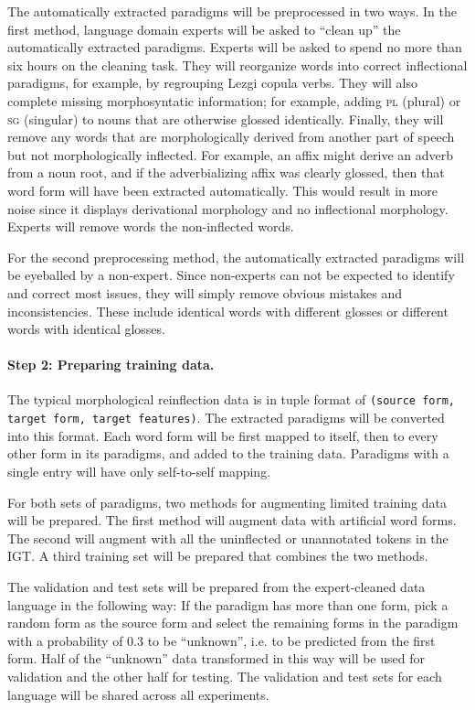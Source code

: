 The automatically extracted paradigms will be preprocessed in two ways. In the first method, language domain experts will be asked to ``clean up'' the automatically extracted paradigms. Experts will be asked to spend no more than six hours on the cleaning task. They will reorganize words into correct inflectional paradigms, for example, by regrouping Lezgi copula verbs. They will also complete missing morphosyntatic information; for example, adding \textsc{pl} (plural) or \textsc{sg} (singular) to nouns that are otherwise glossed identically. Finally, they will remove any words that are morphologically derived from another part of speech but not morphologically inflected. For example, an affix might derive an adverb from a noun root, and if the adverbializing affix was clearly glossed, then that word form will have been extracted automatically. This would result in more noise since it displays derivational morphology and no inflectional morphology. Experts will remove words the non-inflected words.

For the second preprocessing method, the automatically extracted paradigms will be eyeballed by a non-expert. Since non-experts can not be expected to identify and correct most issues, they will simply remove obvious mistakes and inconsistencies. These include identical words with different glosses or different words with identical glosses.


\paragraph{Step 2: Preparing training data.}
The typical morphological reinflection data is in tuple format of \texttt{(source form, target form, target features)}. The extracted paradigms will be converted into this format. Each word form will be first mapped to itself, then to every other form in its paradigms, and added to the training data. Paradigms with a single entry will have only self-to-self mapping. 

For both sets of paradigms, two methods for augmenting limited training data will be prepared. The first method will augment data with artificial word forms. The second will augment with all the uninflected or unannotated tokens in the IGT. A third training set will be prepared that combines the two methods.

The validation and test sets will be prepared from the expert-cleaned data language in the following way: If the paradigm has more than one form, pick a random form as the source form and select the remaining forms in the paradigm with a probability of 0.3 to be ``unknown'', i.e. to be predicted from the first form. Half of the ``unknown'' data transformed in this way will be used for validation and the other half for testing. The validation and test sets for each language will be shared across all experiments.
 
